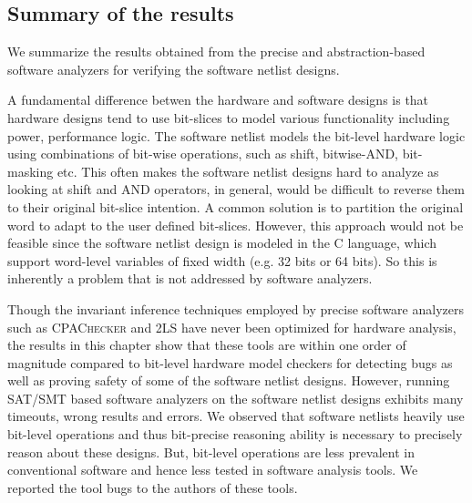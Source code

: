 
\subsection{Summary of the results} 
%
We summarize the results obtained from the precise and abstraction-based 
software analyzers for verifying the software netlist designs.


A fundamental difference betwen the hardware and software designs is that 
hardware designs tend to use bit-slices to model various functionality 
including power, performance logic.  The software netlist models the 
bit-level hardware logic using combinations of bit-wise operations, 
such as shift, bitwise-AND, bit-masking etc.  
%
This often makes the software netlist designs hard to analyze 
as looking at shift and AND operators, in general, would be difficult 
to reverse them to their original bit-slice intention.
%
A common solution is to partition the original word to adapt to the user 
defined bit-slices.  However, this approach would not be feasible since 
the software netlist design is modeled in the C language, which support word-level 
variables of fixed width (e.g. 32 bits or 64 bits). So this is inherently 
a problem that is not addressed by software analyzers.

%
Though the invariant inference techniques employed by precise software 
analyzers such as \textsc{CPAChecker} and \textsc{2LS} have never
been optimized for hardware analysis, the results in this chapter 
show that these tools are within one order of magnitude compared to
bit-level hardware model checkers for detecting bugs as well as 
proving safety of some of the software netlist designs.  However, 
running SAT/SMT based software analyzers on the software netlist 
designs exhibits many 
timeouts, wrong results and errors.  We observed that software netlists 
heavily use bit-level operations and thus bit-precise reasoning ability 
is necessary to precisely reason about these designs.  But, bit-level 
operations are less prevalent in conventional software and hence less 
tested in software analysis tools.  We reported the tool bugs to the 
authors of these tools.


